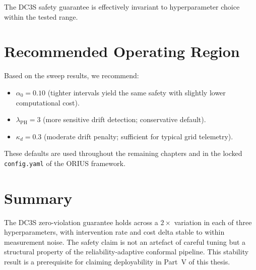 The DC3S safety guarantee is effectively invariant to hyperparameter
choice within the tested range.

\section{Recommended Operating Region}

Based on the sweep results, we recommend:
\begin{itemize}
  \item $\alpha_0 = 0.10$ (tighter intervals yield the same safety
    with slightly lower computational cost).
  \item $\lambda_{\mathrm{PH}} = 3$ (more sensitive drift detection;
    conservative default).
  \item $\kappa_d = 0.3$ (moderate drift penalty; sufficient for
    typical grid telemetry).
\end{itemize}

These defaults are used throughout the remaining chapters and in the
locked \texttt{config.yaml} of the ORIUS framework.

\section{Summary}

The DC3S zero-violation guarantee holds across a $2\times$ variation
in each of three hyperparameters, with intervention rate and cost delta
stable to within measurement noise.  The safety claim is not an artefact
of careful tuning but a structural property of the reliability-adaptive
conformal pipeline.  This stability result is a prerequisite for
claiming deployability in Part~V of this thesis.
